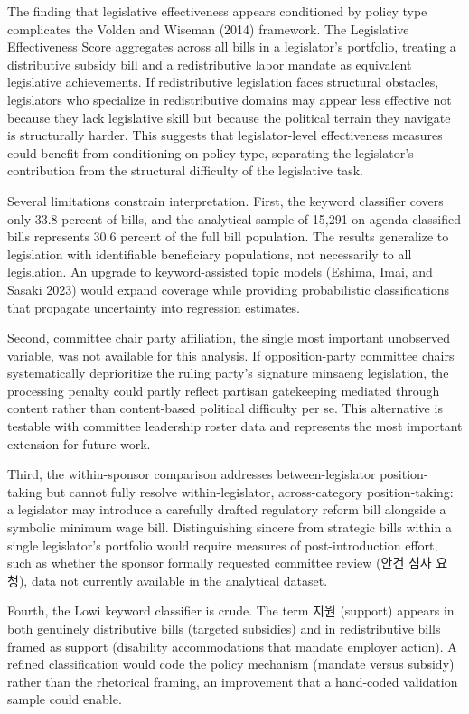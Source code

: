 \documentclass[11pt]{article}
\begin{document}
The finding that legislative effectiveness appears conditioned by policy type complicates the Volden and Wiseman (2014) framework. The Legislative Effectiveness Score aggregates across all bills in a legislator's portfolio, treating a distributive subsidy bill and a redistributive labor mandate as equivalent legislative achievements. If redistributive legislation faces structural obstacles, legislators who specialize in redistributive domains may appear less effective not because they lack legislative skill but because the political terrain they navigate is structurally harder. This suggests that legislator-level effectiveness measures could benefit from conditioning on policy type, separating the legislator's contribution from the structural difficulty of the legislative task.

Several limitations constrain interpretation. First, the keyword classifier covers only 33.8 percent of bills, and the analytical sample of 15,291 on-agenda classified bills represents 30.6 percent of the full bill population. The results generalize to legislation with identifiable beneficiary populations, not necessarily to all legislation. An upgrade to keyword-assisted topic models (Eshima, Imai, and Sasaki 2023) would expand coverage while providing probabilistic classifications that propagate uncertainty into regression estimates.

Second, committee chair party affiliation, the single most important unobserved variable, was not available for this analysis. If opposition-party committee chairs systematically deprioritize the ruling party's signature minsaeng legislation, the processing penalty could partly reflect partisan gatekeeping mediated through content rather than content-based political difficulty per se. This alternative is testable with committee leadership roster data and represents the most important extension for future work.

Third, the within-sponsor comparison addresses between-legislator position-taking but cannot fully resolve within-legislator, across-category position-taking: a legislator may introduce a carefully drafted regulatory reform bill alongside a symbolic minimum wage bill. Distinguishing sincere from strategic bills within a single legislator's portfolio would require measures of post-introduction effort, such as whether the sponsor formally requested committee review (안건 심사 요청), data not currently available in the analytical dataset.

Fourth, the Lowi keyword classifier is crude. The term 지원 (support) appears in both genuinely distributive bills (targeted subsidies) and in redistributive bills framed as support (disability accommodations that mandate employer action). A refined classification would code the policy mechanism (mandate versus subsidy) rather than the rhetorical framing, an improvement that a hand-coded validation sample could enable.
\end{document}
